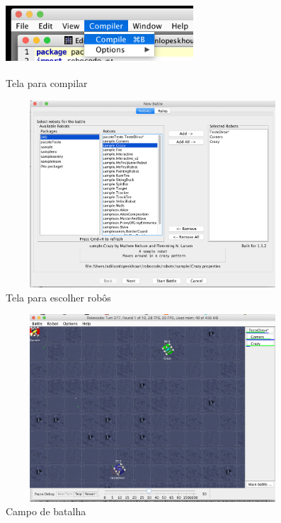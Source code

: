 \begin{frame}
	\begin{block}{}
		\begin{figure}[!htb]
			\centering	  				
			\includegraphics[height=3cm, width = 7cm]{./pic/compilar.png}
			\caption{Tela para compilar}
			\label{fig_instalacao04}
		\end{figure}
	\end{block}
\end{frame}


\begin{frame}
	\begin{block}{}
		\begin{figure}[!htb]
			\centering	  				
			\includegraphics[height=7cm, width = 11cm]{./pic/escolhaRobos.png}
			\caption{Tela para escolher robôs}
			\label{fig_instalacao04}
		\end{figure}
	\end{block}
\end{frame}


\begin{frame}
	\begin{block}{}
		\begin{figure}[!htb]
			\centering	  				
			\includegraphics[height=7cm, width = 11cm]{./pic/batalha.png}
			\caption{Campo de batalha}
			\label{fig_instalacao04}
		\end{figure}
	\end{block}
\end{frame}



